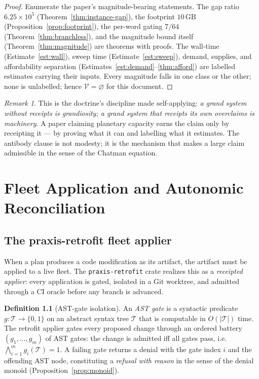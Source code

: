 \documentclass[11pt,oneside]{book}
\theoremstyle{definition}
\newtheorem{definition}{Definition}[chapter]
\theoremstyle{plain}
\theoremstyle{remark}
\newtheorem*{remark}{Remark}
\newcommand{\code}[1]{\texttt{#1}}
\newcommand{\Over}{\mathcal{V}}                %
\begin{document}
\begin{proof}
Enumerate the paper's magnitude-bearing statements. %
The gap ratio $6.25\times 10^{5}$ (Theorem~\ref{thm:instance-gap}), the footprint $10\,\mathrm{GB}$ (Proposition~\ref{prop:footprint}), the per-word gating $7/64$ (Theorem~\ref{thm:branchless}), and the magnitude bound itself (Theorem~\ref{thm:magnitude}) are theorems with proofs. %
The wall-time (Estimate~\ref{est:wall}), sweep time (Estimate~\ref{est:sweep}), demand, supplies, and affordability separation (Estimates~\ref{est:demand}--\ref{thm:afford}) are labelled estimates carrying their inputs. %
Every magnitude falls in one class or the other; none is unlabelled; hence $\Over=\varnothing$ for this document. %
\end{proof}

\begin{remark}
This is the doctrine's discipline made self-applying: \emph{a grand system without receipts is grandiosity; a grand system that receipts its own overclaims is machinery}. %
A paper claiming planetary capacity earns the claim only by receipting it --- by proving what it can and labelling what it estimates. %
The antibody clause is not modesty; it is the mechanism that makes a large claim admissible in the sense of the Chatman equation. %
\end{remark}

\chapter{Fleet Application and Autonomic Reconciliation}
\label{ch:retrofit}

\section{The praxis-retrofit fleet applier}

When a plan produces a code modification as its artifact, the artifact must be applied to a live fleet. %
The \code{praxis-retrofit} crate realizes this as a \emph{receipted applier}: every application is gated, isolated in a Git worktree, and admitted through a CI oracle before any branch is advanced. %

\begin{definition}[AST-gate isolation]\label{def:astgate}
An \emph{AST gate} is a syntactic predicate $g:\mathcal{T}\to\{0,1\}$ on an abstract syntax tree $\mathcal{T}$ that is computable in $O(|\mathcal{T}|)$ time. %
The retrofit applier gates every proposed change through an ordered battery $(g_1,\dots,g_m)$ of AST gates: the change is admitted iff all gates pass, i.e.\ $\bigwedge_{i=1}^m g_i(\mathcal{T})=1$. %
A failing gate returns a denial with the gate index $i$ and the offending AST node, constituting a \emph{refusal with reason} in the sense of the denial monoid (Proposition~\ref{prop:monoid}). %
\end{definition}
\end{document}
